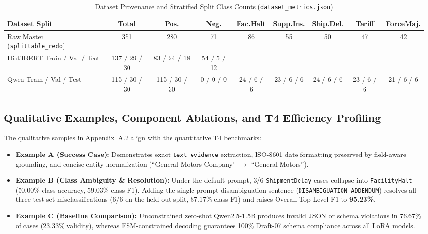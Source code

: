 \documentclass[11pt,a4paper]{article}
\begin{document}
\begin{table}[htbp]
\centering
\caption{Dataset Provenance and Stratified Split Class Counts (\texttt{dataset\_metrics.json})}
\label{tab:dataset_splits}
\small
\begin{tabular}{@{}l c c c ccccc@{}}
\toprule
\textbf{Dataset Split} & \textbf{Total} & \textbf{Pos.} & \textbf{Neg.} & \textbf{Fac.Halt} & \textbf{Supp.Ins.} & \textbf{Ship.Del.} & \textbf{Tariff} & \textbf{ForceMaj.} \\
\midrule
Raw Master (\texttt{splittable\_redo}) & 351 & 280 & 71 & 86 & 55 & 50 & 47 & 42 \\
DistilBERT Train / Val / Test & 137 / 29 / 30 & 83 / 24 / 18 & 54 / 5 / 12 & --- & --- & --- & --- & --- \\
Qwen Train / Val / Test & 115 / 30 / 30 & 115 / 30 / 30 & 0 / 0 / 0 & 24 / 6 / 6 & 23 / 6 / 6 & 24 / 6 / 6 & 23 / 6 / 6 & 21 / 6 / 6 \\
\bottomrule
\end{tabular}
\end{table}

\subsection{Qualitative Examples, Component Ablations, and T4 Efficiency Profiling}
The qualitative samples in Appendix~A.2 align with the quantitative T4 benchmarks:
\begin{itemize}[leftmargin=1.5em]
\item \textbf{Example A (Success Case):} Demonstrates exact \texttt{text\_evidence} extraction, ISO-8601 date formatting preserved by field-aware grounding, and concise entity normalization (``General Motors Company'' $\to$ ``General Motors'').
\item \textbf{Example B (Class Ambiguity \& Resolution):} Under the default prompt, 3/6 \texttt{ShipmentDelay} cases collapse into \texttt{FacilityHalt} (50.00\% class accuracy, 59.03\% class F1). Adding the single prompt disambiguation sentence (\texttt{DISAMBIGUATION\_ADDENDUM}) resolves all three test-set misclassifications (6/6 on the held-out split, 87.17\% class F1) and raises Overall Top-Level F1 to \textbf{95.23\%}.
\item \textbf{Example C (Baseline Comparison):} Unconstrained zero-shot Qwen2.5-1.5B produces invalid JSON or schema violations in 76.67\% of cases (23.33\% validity), whereas FSM-constrained decoding guarantees 100\% Draft-07 schema compliance across all LoRA models.
\end{itemize}
\end{document}
